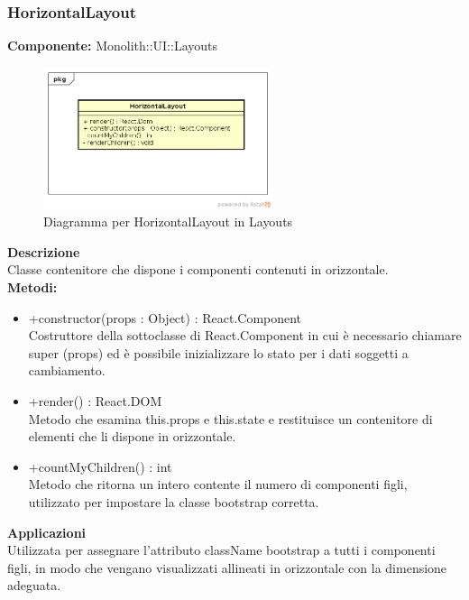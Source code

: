 \subsubsection{HorizontalLayout}
\textbf{Componente:}  Monolith::UI::Layouts\\
   \FloatBarrier
   \begin{figure}[ht]
   \centering
   \includegraphics[width=0.6\textwidth]{img/single-HorizontalLayout}
   \caption{{Diagramma per HorizontalLayout in Layouts}}
\end{figure}
\FloatBarrier
\textbf{Descrizione}\\
Classe contenitore che dispone i componenti contenuti in orizzontale. \\
\textbf{Metodi:}
\begin{itemize}

\item +constructor(props : Object) : React.Component 
\\
Costruttore della sottoclasse di React.Component in cui è necessario chiamare super (props) ed è possibile inizializzare lo stato per i dati soggetti a cambiamento.

\item +render() : React.DOM 
\\
Metodo che esamina this.props e this.state e restituisce un contenitore di elementi che li dispone in orizzontale.

\item +countMyChildren() : int \\
Metodo che ritorna un intero contente il numero di componenti figli, utilizzato per impostare la classe bootstrap corretta.

\end{itemize} 


\textbf{Applicazioni}\\
Utilizzata per assegnare l'attributo className bootstrap a tutti i componenti figli, in modo che vengano visualizzati allineati in orizzontale con la dimensione adeguata. 


